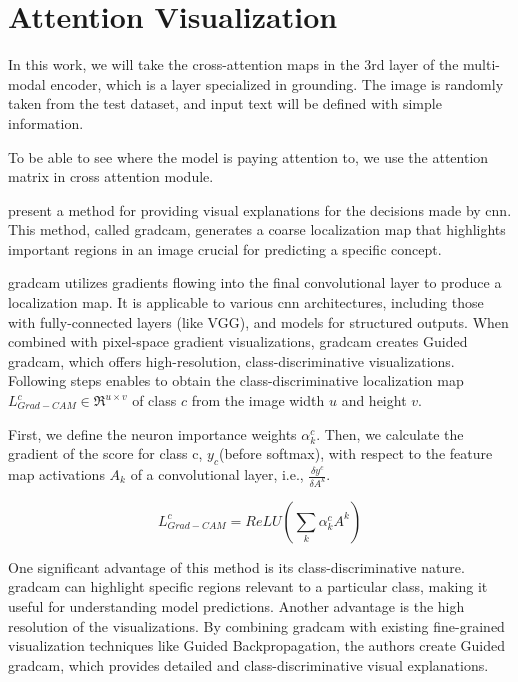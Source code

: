 \section{Attention Visualization}
In this work, we will take the cross-attention maps in the 3rd layer of the multi-modal encoder, which is a layer specialized in grounding. The image is randomly taken from the test dataset, and input text will be defined with simple information.

To be able to see where the model is paying attention to, we use the attention matrix in cross attention module. 

\cite{gradcam} present a method for providing visual explanations for the decisions made by \acrshort{cnn}. This method, called \acrfull{gradcam}, generates a coarse localization map that highlights important regions in an image crucial for predicting a specific concept.

\acrshort{gradcam} utilizes gradients flowing into the final convolutional layer to produce a localization map. It is applicable to various \acrshort{cnn} architectures, including those with fully-connected layers (like VGG), and models for structured outputs. When combined with pixel-space gradient visualizations, \acrshort{gradcam} creates Guided \acrshort{gradcam}, which offers high-resolution, class-discriminative visualizations.
Following steps enables to obtain the class-discriminative localization map $L^c_{Grad-CAM} \in\Re^{u \times v}$ of class $c$ from the image width $u$ and height $v$. 

First, we define the neuron importance weights $\alpha^c_k$. Then, we calculate the gradient of the score for class c, $y_c$(before softmax), with respect to the feature map activations $A_k$ of a convolutional layer, i.e., $\frac{\delta y^c}{\delta A^k}$. 
 
\begin{displaymath}
    L^c_{Grad-CAM} = ReLU(\sum_k\alpha^c_kA^k)
\end{displaymath}

One significant advantage of this method is its class-discriminative nature. \acrshort{gradcam} can highlight specific regions relevant to a particular class, making it useful for understanding model predictions. Another advantage is the high resolution of the visualizations. By combining \acrshort{gradcam} with existing fine-grained visualization techniques like Guided Backpropagation, the authors create Guided \acrshort{gradcam}, which provides detailed and class-discriminative visual explanations.



